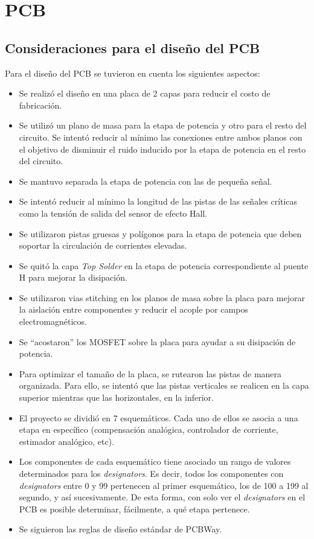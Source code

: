 \section{PCB}
\subsection{Consideraciones para el diseño del PCB}
Para el diseño del PCB se tuvieron en cuenta los siguientes aspectos:

\begin{itemize}
	\item Se realizó el diseño en una placa de 2 capas para reducir el costo de fabricación.
	\item Se utilizó un plano de masa para la etapa de potencia y otro para el resto del circuito. Se intentó reducir al mínimo las conexiones entre ambos planos con el objetivo de disminuir el ruido inducido por la etapa de potencia en el resto del circuito.
	\item Se mantuvo separada la etapa de potencia con las de pequeña señal.
	\item Se intentó reducir al mínimo la longitud de las pistas de las señales críticas como la tensión de salida del sensor de efecto Hall.
	\item Se utilizaron pistas gruesas y polígonos para la etapa de potencia que deben soportar la circulación de corrientes elevadas.
	\item Se quitó la capa \textsl{Top Solder} en la etapa de potencia correspondiente al puente H para mejorar la disipación.
	\item Se utilizaron vias stitching en los planos de masa sobre la placa para mejorar la aislación entre componentes y reducir el acople por campos electromagnéticos.
	\item Se ``acostaron'' los MOSFET sobre la placa para ayudar a su disipación de potencia.
	\item Para optimizar el tamaño de la placa, se rutearon las pistas de manera organizada. Para ello, se intentó que las pistas verticales se realicen en la capa superior mientras que las horizontales, en la inferior.
	\item El proyecto se dividió en 7 esquemáticos. Cada uno de ellos se asocia a una etapa en específico (compensación analógica, controlador de corriente, estimador analógico, etc). 
	\item  Los componentes de cada esquemático tiene asociado un rango de valores determinados para los \textsl{designators}. Es decir, todos los componentes con \textsl{designators} entre 0 y 99 pertenecen al primer esquemático, los de 100 a 199 al segundo, y así sucesivamente.  De esta forma, con solo ver el \textsl{designators} en el PCB es posible determinar, fácilmente, a qué etapa pertenece.  
	\item Se siguieron las reglas de diseño estándar de PCBWay.
	
\end{itemize}



